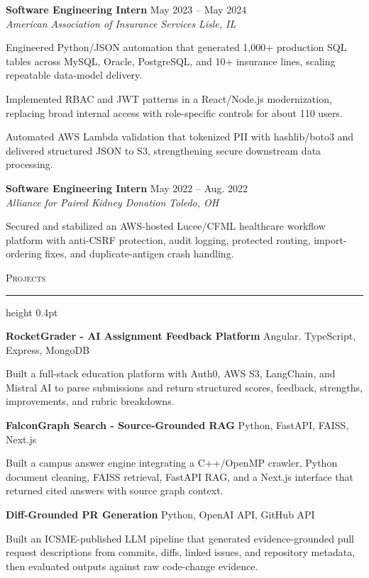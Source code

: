 \documentclass[letterpaper,11pt]{article}
\newcommand{\resumesection}[1]{%
  \par\vspace{2pt}%
  {\large\scshape #1}\par\vspace{2pt}%
  \hrule height 0.4pt\vspace{2pt}%
}
\newcommand{\resumeSubheading}[4]{
  \textbf{#1} \hfill #2\\
  \textit{#3} \hfill \textit{#4}
}
\newcommand{\projectHeading}[2]{
  \textbf{#1} \hfill #2
}
\begin{document}
\resumeSubheading
{Software Engineering Intern}{May 2023 -- May 2024}
{American Association of Insurance Services}{Lisle, IL}
\begin{tightitemize}
  \item Engineered Python/JSON automation that generated 1,000+ production SQL tables across MySQL, Oracle, PostgreSQL, and 10+ insurance lines, scaling repeatable data-model delivery.
  \item Implemented RBAC and JWT patterns in a React/Node.js modernization, replacing broad internal access with role-specific controls for about 110 users.
  \item Automated AWS Lambda validation that tokenized PII with hashlib/boto3 and delivered structured JSON to S3, strengthening secure downstream data processing.
\end{tightitemize}

\resumeSubheading
{Software Engineering Intern}{May 2022 -- Aug. 2022}
{Alliance for Paired Kidney Donation}{Toledo, OH}
\begin{tightitemize}
  \item Secured and stabilized an AWS-hosted Lucee/CFML healthcare workflow platform with anti-CSRF protection, audit logging, protected routing, import-ordering fixes, and duplicate-antigen crash handling.
\end{tightitemize}

\resumesection{Projects}
\projectHeading{RocketGrader - AI Assignment Feedback Platform}{Angular, TypeScript, Express, MongoDB}
\begin{tightitemize}
  \item Built a full-stack education platform with Auth0, AWS S3, LangChain, and Mistral AI to parse submissions and return structured scores, feedback, strengths, improvements, and rubric breakdowns.
\end{tightitemize}

\projectHeading{FalconGraph Search - Source-Grounded RAG}{Python, FastAPI, FAISS, Next.js}
\begin{tightitemize}
  \item Built a campus answer engine integrating a C++/OpenMP crawler, Python document cleaning, FAISS retrieval, FastAPI RAG, and a Next.js interface that returned cited answers with source graph context.
\end{tightitemize}

\projectHeading{Diff-Grounded PR Generation}{Python, OpenAI API, GitHub API}
\begin{tightitemize}
  \item Built an ICSME-published LLM pipeline that generated evidence-grounded pull request descriptions from commits, diffs, linked issues, and repository metadata, then evaluated outputs against raw code-change evidence.
\end{tightitemize}
\end{document}
